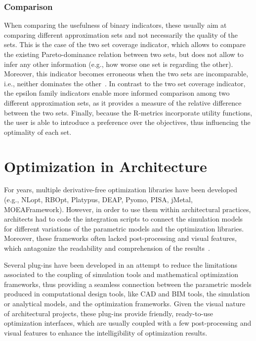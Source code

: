 	\subsubsection{Comparison}
	\label{ssec:comparisonindicators}
	When comparing the usefulness of binary indicators, these usually aim at comparing different approximation sets and not necessarily the quality of the sets. This is the case of the two set coverage indicator, which allows to compare the existing Pareto-dominance relation between two sets, but does not allow to infer any other information (e.g., how worse one set is regarding the other). Moreover, this indicator becomes erroneous when the two sets are incomparable, i.e., neither dominates the other~\cite{Zitzler2003Metrics}. In contrast to the two set coverage indicator, the epsilon family indicators enable more informed comparison among two different approximation sets, as it provides a measure of the relative difference between the two sets. Finally, because the R-metrics incorporate utility functions, the user is able to introduce a preference over the objectives, thus influencing the optimality of each set. 
	
	
	\section{Optimization in Architecture}	
	\label{sec:optimizationtools}
	
	For years, multiple derivative-free optimization libraries have been developed (e.g., NLopt, RBOpt, Platypus, DEAP, Pyomo, PISA, jMetal, MOEAFramework). However, in order to use them within architectural practices, architects had to code the integration scripts to connect the simulation models for different variations of the parametric models and the optimization libraries\cite{Attia2013}. Moreover, these frameworks often lacked post-processing and visual features, which antagonize the readability and comprehension of the results~\cite{Attia2013,Nguyen2014}.
	
	Several plug-ins have been developed in an attempt to reduce the limitations associated to the coupling of simulation tools and mathematical optimization frameworks, thus providing a seamless connection between the parametric models produced in computational design tools, like \ac{CAD} and \ac{BIM} tools, the simulation or analytical models, and the optimization frameworks. Given the visual nature of architectural projects, these plug-ins provide friendly, ready-to-use optimization interfaces, which are usually coupled with a few post-processing and visual features to enhance the intelligibility of optimization results. 
	

